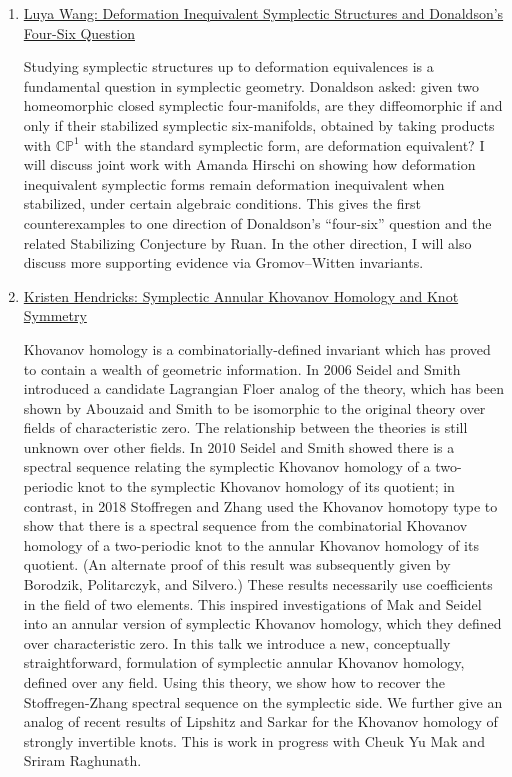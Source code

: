 \begin{partbacktext}
\begin{enumerate}
    \item \href{#wang}{Luya Wang: Deformation Inequivalent Symplectic Structures and Donaldson's Four-Six Question}

    Studying symplectic structures up to deformation equivalences is a fundamental question in symplectic geometry. Donaldson asked: given two homeomorphic closed symplectic four-manifolds, are they diffeomorphic if and only if their stabilized symplectic six-manifolds, obtained by taking products with $\mathbb{CP}^1$ with the standard symplectic form, are deformation equivalent? I will discuss joint work with Amanda Hirschi on showing how deformation inequivalent symplectic forms remain deformation inequivalent when stabilized, under certain algebraic conditions. This gives the first counterexamples to one direction of Donaldson’s “four-six” question and the related Stabilizing Conjecture by Ruan. In the other direction, I will also discuss more supporting evidence via Gromov–Witten invariants.

    \item \href{#hendricks}{Kristen Hendricks: Symplectic Annular Khovanov Homology and Knot Symmetry}
    
    Khovanov homology is a combinatorially-defined invariant which has proved to contain a wealth of geometric information. In 2006 Seidel and Smith introduced a candidate Lagrangian Floer analog of the theory, which has been shown by Abouzaid and Smith to be isomorphic to the original theory over fields of characteristic zero. The relationship between the theories is still unknown over other fields. In 2010 Seidel and Smith showed there is a spectral sequence relating the symplectic Khovanov homology of a two-periodic knot to the symplectic Khovanov homology of its quotient; in contrast, in 2018 Stoffregen and Zhang used the Khovanov homotopy type to show that there is a spectral sequence from the combinatorial Khovanov homology of a two-periodic knot to the annular Khovanov homology of its quotient. (An alternate proof of this result was subsequently given by Borodzik, Politarczyk, and Silvero.) These results necessarily use coefficients in the field of two elements. This inspired investigations of Mak and Seidel into an annular version of symplectic Khovanov homology, which they defined over characteristic zero. In this talk we introduce a new, conceptually straightforward, formulation of symplectic annular Khovanov homology, defined over any field. Using this theory, we show how to recover the Stoffregen-Zhang spectral sequence on the symplectic side. We further give an analog of recent results of Lipshitz and Sarkar for the Khovanov homology of strongly invertible knots. This is work in progress with Cheuk Yu Mak and Sriram Raghunath.


\end{enumerate}
\end{partbacktext}
